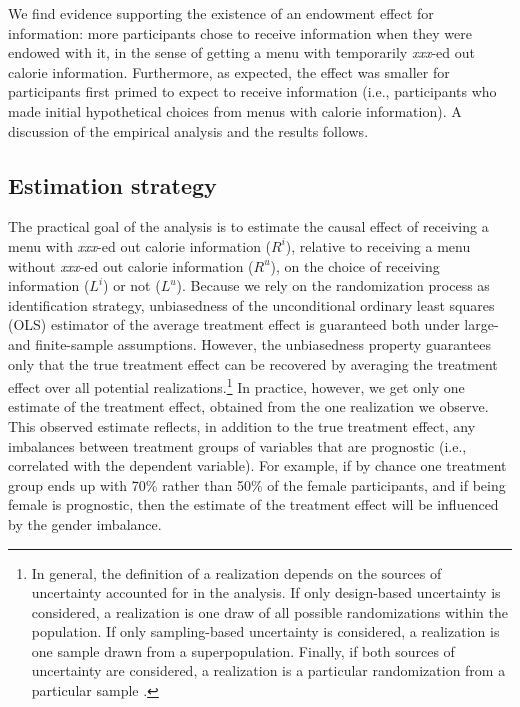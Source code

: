 
We find evidence supporting the existence of an endowment effect for information: more participants chose to receive information when they were endowed with it, in the sense of getting a menu with temporarily \emph{xxx}-ed out calorie information. Furthermore, as expected, the effect was smaller for participants first primed to expect to receive information (i.e., participants who made initial hypothetical choices from menus with calorie information). A discussion of the empirical analysis and the results follows.

\subsection{Estimation strategy}

The practical goal of the analysis is to estimate the causal effect of receiving a menu with \emph{xxx}-ed out calorie information ($R^i$), relative to receiving a menu without \emph{xxx}-ed out calorie information ($R^u$), on the choice of receiving information ($L^i$) or not ($L^u$). Because we rely on the randomization process as identification strategy, unbiasedness of the unconditional ordinary least squares (OLS) estimator of the average treatment effect is guaranteed both under large- and finite-sample assumptions. However, the unbiasedness property guarantees only that the true treatment effect can be recovered by averaging the treatment effect over all potential realizations.\footnote{In general, the definition of a realization depends on the sources of uncertainty accounted for in the analysis. If only design-based uncertainty is considered, a realization is one draw of all possible randomizations within the population. If only sampling-based uncertainty is considered, a realization is one sample drawn from a superpopulation. Finally, if both sources of uncertainty are considered, a realization is a particular randomization from a particular sample \citet{abadieSamplingBasedDesignBasedUncertainty2020}.} In practice, however, we get only one estimate of the treatment effect, obtained from the one realization we observe. This observed estimate reflects, in addition to the true treatment effect, any imbalances between treatment groups of variables that are prognostic (i.e., correlated with the dependent variable). For example, if by chance one treatment group ends up with 70\% rather than 50\% of the female participants, and if being female is prognostic, then the estimate of the treatment effect will be influenced by the gender imbalance.


